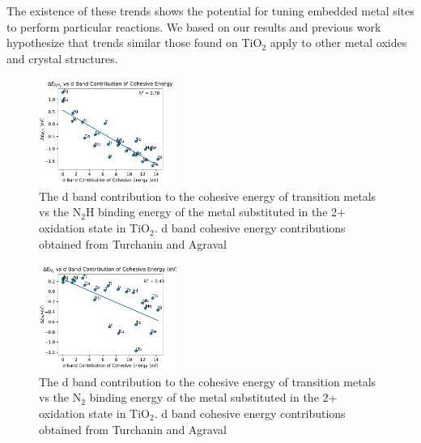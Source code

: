 The existence of these trends shows the potential for tuning embedded metal sites to perform particular reactions. We based on our results and previous work \cite{Xu_2015,Garc_a_Mota_2011,Yao_2017} hypothesize that trends similar those found on TiO$_2$ apply to other metal oxides and crystal structures.





\begin{figure}
    \centering
    \includegraphics[width=0.4\textwidth]{Images/cohesive_eng_vs_N2H.pdf}
    
    \caption{The d band contribution to the cohesive energy of transition metals vs the N$_2$H binding energy of the metal substituted in the 2+ oxidation state in TiO$_2$. d band cohesive energy contributions obtained from Turchanin and Agraval\cite{Turchanin_2008}}
    \label{fig:N2H_cohesive}
\end{figure}

\begin{figure}
    \centering
    \includegraphics[width=0.4\textwidth]{Images/cohesive_eng_vs_N2.pdf}
    
    \caption{The d band contribution to the cohesive energy of transition metals vs the N$_2$ binding energy of the metal substituted in the 2+ oxidation state in TiO$_2$. d band cohesive energy contributions obtained from Turchanin and Agraval\cite{Turchanin_2008}}
    \label{fig:N2_cohesive}
\end{figure}


